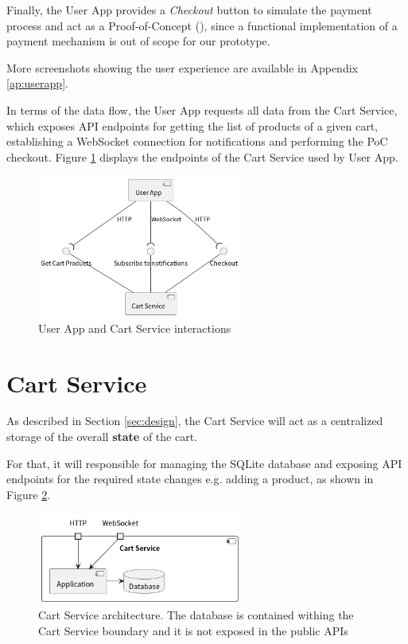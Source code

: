 \documentclass[openright]{normas-utf-tex} %
\begin{document}
Finally, the User App provides a \textit{Checkout} button to simulate the payment process
and act as a Proof-of-Concept (), since a functional
implementation of a payment mechanism is out of scope for our prototype.

More screenshots showing the user experience are available in Appendix \ref{ap:userapp}.

In terms of the data flow, the User App requests all data from the Cart
Service, which exposes API endpoints for getting the list of products of a
given cart, establishing a WebSocket connection for notifications and
performing the PoC checkout. Figure \ref{fig:userappdataflow} displays the
endpoints of the Cart Service used by User App.

\begin{figure}[H]
	\centering
	\includegraphics[width=0.6\textwidth]{./images/diagrams/UserApp.png}
	\caption[User App and Cart Service interactions]{User App and Cart Service interactions}
	\label{fig:userappdataflow}
\end{figure}

\section{Cart Service}

As described in Section \ref{sec:design}, the Cart Service will act as a
centralized storage of the overall \textbf{state} of the cart.

For that, it will responsible for managing the SQLite database and exposing API
endpoints for the required state changes e.g. adding a product, as shown in 
Figure \ref{fig:cartservicearch}.

\begin{figure}[H]
	\centering
	\includegraphics[width=0.6\textwidth]{./images/diagrams/CartService.png}
    \caption[Cart Service architecture]{Cart Service architecture. The database
    is contained withing the Cart Service boundary and it is not exposed in the
    public APIs}
	\label{fig:cartservicearch}
\end{figure}
\end{document}
